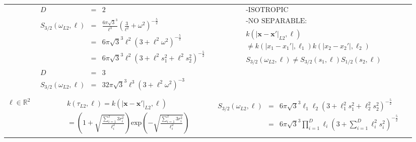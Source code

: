 \documentclass[]{interact}
\theoremstyle{plain}%
\theoremstyle{definition}
\theoremstyle{remark}
\begin{document}
\begin{landscape}
\begin{table}[H]
\begin{center}
\begin{tabular}{|c|c|c|c|}
       & \multicolumn{1}{|p{7.5cm}|}{\small
         \begin{eqnarray*}
		D &=& 2\\
		\\
		S_{3/2}(\omega_{L2},\ell) &=& \frac{6\pi\sqrt{3}^3}{\ell^3}\left(\frac{3}{\ell^2}+\omega^2 \right)^{-\frac{5}{2}} \\
		&=& 6\pi\sqrt{3}^3\ell^2\left(3+\ell^2\omega^2 \right)^{-\frac{5}{2}} \\
		&=& 6\pi\sqrt{3}^3\ell^2\left(3+\ell^2s_1^2+\ell^2s_2^2 \right)^{-\frac{5}{2}} \\
		\\
		D &=& 3\\
		S_{3/2}(\omega_{L2},\ell) &=& 32\pi\sqrt{3}^3\ell^3\left(3+\ell^2\omega^2 \right)^{-3}
         \end{eqnarray*}
       }
       
       & \multicolumn{1}{|p{6.2cm}|}{\small
         \begin{eqnarray*}
        &&\text{-ISOTROPIC}\\
        \\
		&&\text{-NO SEPARABLE:} \\
		\\
		&&k(|\bm{x}-\bm{x}'|_{L2},\bm{\ell})\\
		 &&\neq k(|x_1-x_1'|,\ell_1)k(|x_2-x_2'|,\ell_2)\\
		 \\
		&&S_{3/2}(\omega_{L2},\ell)\neq S_{3/2}(s_1,\ell)S_{1/2}(s_2,\ell)
         \end{eqnarray*} 
       }\\
       \vspace{-10mm}\\
        \cline{1-3}
         
       \multicolumn{1}{|p{1.5cm}|}{
       \vspace{1mm}
       $\bm{\ell} \in \mathbb{R}^2$
       }
       
         & \multicolumn{1}{|p{7.2cm}|}{\small
         \begin{eqnarray*}
		&&k(\tau_{L2},\bm{\ell}) = k(|\bm{x}-\bm{x}'|_{L2},\bm{\ell})\\
		&&= \left(1+\sqrt{\frac{\sum_{i=1}^{2}3r_i^2}{\ell_i^2}} \right)\mathrm{exp}\left(-\sqrt{\frac{\sum_{i=1}^{2}3r_i^2}{\ell_i^2}} \right)
         \end{eqnarray*}
       }
       
       & \multicolumn{1}{|p{7.2cm}|}{\small
         \begin{eqnarray*}
		S_{3/2}(\omega_{L2},\bm{\ell}) &=& 6\pi\sqrt{3}^3\ell_1\ell_2\left(3+\ell_1^2s_1^2+\ell_2^2s_2^2 \right)^{-\frac{5}{2}} \\
		&=& 6\pi\sqrt{3}^3\prod_{i=1}^{D}\ell_i\left(3+\sum_{i=1}^{D}\ell_i^2s_i^2 \right)^{-\frac{5}{2}} \\
         \end{eqnarray*}
       }
       

\end{tabular}
\end{center}
\end{table}
\end{landscape}
\end{document}
